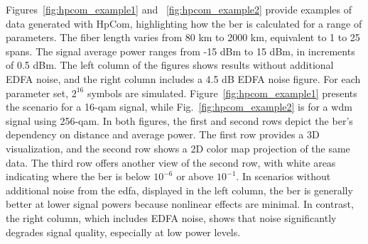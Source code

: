 
Figures~\ref{fig:hpcom_example1} and ~\ref{fig:hpcom_example2} provide examples of data generated with HpCom, highlighting how the \acrshort{ber} is calculated for a range of parameters. The fiber length varies from 80 km to 2000 km, equivalent to 1 to 25 spans. 
The signal average power ranges from -15 dBm to 15 dBm, in increments of 0.5 dBm. The left column of the figures shows results without additional EDFA noise, and the right column includes a 4.5 dB EDFA noise figure. For each parameter set, $2^{16}$ symbols are simulated. Figure~\ref{fig:hpcom_example1} presents the scenario for a 16-\acrshort{qam} signal, while Fig.~\ref{fig:hpcom_example2} is for a \acrshort{wdm} signal using 256-\acrshort{qam}. In both figures, the first and second rows depict the \acrshort{ber}'s dependency on distance and average power. The first row provides a 3D visualization, and the second row shows a 2D color map projection of the same data. The third row offers another view of the second row, with white areas indicating where the \acrshort{ber} is below $10^{-6}$ or above $10^{-1}$. In scenarios without additional noise from the \gls{edfa}, displayed in the left column, the \acrshort{ber} is generally better at lower signal powers because nonlinear effects are minimal. In contrast, the right column, which includes EDFA noise, shows that noise significantly degrades signal quality, especially at low power levels.


